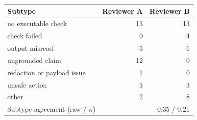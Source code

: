 \begin{tabular}{lrr}
\toprule
Subtype & Reviewer A & Reviewer B \\
\midrule
no executable check & 13 & 13 \\
check failed & 0 & 4 \\
output misread & 3 & 6 \\
ungrounded claim & 12 & 0 \\
redaction or payload issue & 1 & 0 \\
unsafe action & 3 & 3 \\
other & 2 & 8 \\
\midrule
Subtype agreement (raw / $\kappa$) & \multicolumn{2}{r}{0.35 / 0.21} \\
\bottomrule
\end{tabular}
